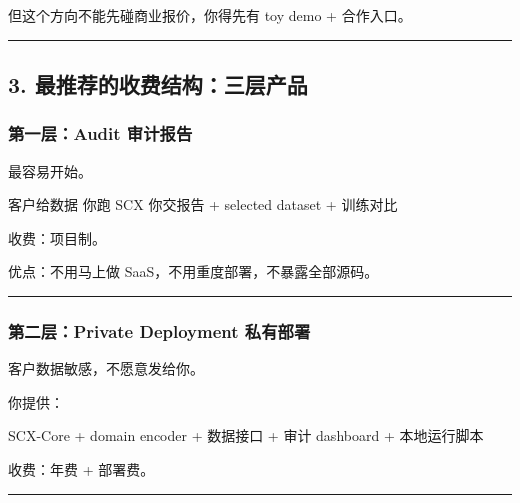 \documentclass[
  12pt,
]{ctexart}
\newenvironment{Shaded}{}{}
\newcommand{\NormalTok}[1]{#1}
\begin{document}
但这个方向不能先碰商业报价，你得先有 toy demo + 合作入口。

\begin{center}\rule{0.5\linewidth}{0.5pt}\end{center}

\subsection{3.
最推荐的收费结构：三层产品}\label{ux6700ux63a8ux8350ux7684ux6536ux8d39ux7ed3ux6784ux4e09ux5c42ux4ea7ux54c1}

\subsubsection{第一层：Audit
审计报告}\label{ux7b2cux4e00ux5c42audit-ux5ba1ux8ba1ux62a5ux544a}

最容易开始。

\begin{Shaded}
\begin{Highlighting}[]
\NormalTok{客户给数据}
\NormalTok{你跑 SCX}
\NormalTok{你交报告 + selected dataset + 训练对比}
\end{Highlighting}
\end{Shaded}

收费：项目制。

优点：不用马上做 SaaS，不用重度部署，不暴露全部源码。

\begin{center}\rule{0.5\linewidth}{0.5pt}\end{center}

\subsubsection{第二层：Private Deployment
私有部署}\label{ux7b2cux4e8cux5c42private-deployment-ux79c1ux6709ux90e8ux7f72}

客户数据敏感，不愿意发给你。

你提供：

\begin{Shaded}
\begin{Highlighting}[]
\NormalTok{SCX{-}Core}
\NormalTok{+ domain encoder}
\NormalTok{+ 数据接口}
\NormalTok{+ 审计 dashboard}
\NormalTok{+ 本地运行脚本}
\end{Highlighting}
\end{Shaded}

收费：年费 + 部署费。

\begin{center}\rule{0.5\linewidth}{0.5pt}\end{center}
\end{document}
